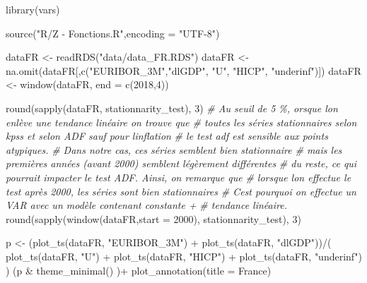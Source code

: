 \documentclass[
  11pt,
]{article}
\newenvironment{Shaded}{\begin{snugshade}}{\end{snugshade}}
\newcommand{\AttributeTok}[1]{\textcolor[rgb]{0.77,0.63,0.00}{#1}}
\newcommand{\CommentTok}[1]{\textcolor[rgb]{0.56,0.35,0.01}{\textit{#1}}}
\newcommand{\DecValTok}[1]{\textcolor[rgb]{0.00,0.00,0.81}{#1}}
\newcommand{\FunctionTok}[1]{\textcolor[rgb]{0.00,0.00,0.00}{#1}}
\newcommand{\NormalTok}[1]{#1}
\newcommand{\OtherTok}[1]{\textcolor[rgb]{0.56,0.35,0.01}{#1}}
\newcommand{\SpecialCharTok}[1]{\textcolor[rgb]{0.00,0.00,0.00}{#1}}
\newcommand{\StringTok}[1]{\textcolor[rgb]{0.31,0.60,0.02}{#1}}
\begin{document}
\begin{Shaded}
\begin{Highlighting}[]
\FunctionTok{library}\NormalTok{(vars)}

\FunctionTok{source}\NormalTok{(}\StringTok{"R/Z {-} Fonctions.R"}\NormalTok{,}\AttributeTok{encoding =} \StringTok{"UTF{-}8"}\NormalTok{)}

\NormalTok{dataFR }\OtherTok{\textless{}{-}} \FunctionTok{readRDS}\NormalTok{(}\StringTok{"data/data\_FR.RDS"}\NormalTok{)}
\NormalTok{dataFR }\OtherTok{\textless{}{-}} \FunctionTok{na.omit}\NormalTok{(dataFR[,}\FunctionTok{c}\NormalTok{(}\StringTok{"EURIBOR\_3M"}\NormalTok{,}\StringTok{"dlGDP"}\NormalTok{,}
                            \StringTok{"U"}\NormalTok{, }\StringTok{"HICP"}\NormalTok{, }\StringTok{"underinf"}\NormalTok{)])}
\NormalTok{dataFR }\OtherTok{\textless{}{-}} \FunctionTok{window}\NormalTok{(dataFR, }\AttributeTok{end =} \FunctionTok{c}\NormalTok{(}\DecValTok{2018}\NormalTok{,}\DecValTok{4}\NormalTok{))}

\FunctionTok{round}\NormalTok{(}\FunctionTok{sapply}\NormalTok{(dataFR, stationnarity\_test), }\DecValTok{3}\NormalTok{)}
\CommentTok{\# Au seuil de 5 \%, orsque l\textquotesingle{}on enlève une tendance linéaire on trouve que}
\CommentTok{\# toutes les séries stationnaires selon kpss et selon ADF sauf pour l\textquotesingle{}inflation}
\CommentTok{\# le test adf est sensible aux points atypiques.}
\CommentTok{\# Dans notre cas, ces séries semblent bien stationnaire}
\CommentTok{\# mais les premières années (avant 2000) semblent légèrement différentes }
\CommentTok{\# du reste, ce qui pourrait impacter le test ADF. Ainsi, on remarque que }
\CommentTok{\# lorsque l\textquotesingle{}on effectue le test après 2000, les séries sont bien stationnaires}
\CommentTok{\# C\textquotesingle{}est pourquoi on effectue un VAR avec un modèle contenant constante + }
\CommentTok{\# tendance linéaire.}
\FunctionTok{round}\NormalTok{(}\FunctionTok{sapply}\NormalTok{(}\FunctionTok{window}\NormalTok{(dataFR,}\AttributeTok{start =} \DecValTok{2000}\NormalTok{), stationnarity\_test), }\DecValTok{3}\NormalTok{)}


\NormalTok{p }\OtherTok{\textless{}{-}}\NormalTok{ (}\FunctionTok{plot\_ts}\NormalTok{(dataFR, }\StringTok{"EURIBOR\_3M"}\NormalTok{) }\SpecialCharTok{+}
          \FunctionTok{plot\_ts}\NormalTok{(dataFR, }\StringTok{"dlGDP"}\NormalTok{))}\SpecialCharTok{/}\NormalTok{(}
              \FunctionTok{plot\_ts}\NormalTok{(dataFR, }\StringTok{"U"}\NormalTok{) }\SpecialCharTok{+} 
                  \FunctionTok{plot\_ts}\NormalTok{(dataFR, }\StringTok{"HICP"}\NormalTok{) }\SpecialCharTok{+} 
                  \FunctionTok{plot\_ts}\NormalTok{(dataFR, }\StringTok{"underinf"}\NormalTok{)}
\NormalTok{              )}
\NormalTok{(p }\SpecialCharTok{\&} \FunctionTok{theme\_minimal}\NormalTok{() )}\SpecialCharTok{+} 
    \FunctionTok{plot\_annotation}\NormalTok{(}\AttributeTok{title =} \StringTok{\textquotesingle{}France\textquotesingle{}}\NormalTok{)}


\end{Highlighting}
\end{Shaded}
\end{document}
